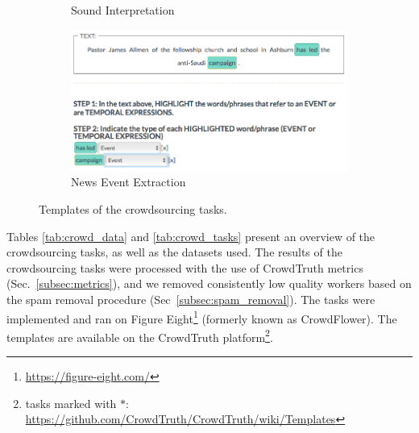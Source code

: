 \begin{figure}[!tb]
\begin{subfigure}{.5\textwidth}
\caption{Sound Interpretation}
\label{fig:screenshot_sounds}
\end{subfigure}%
\begin{subfigure}{.5\textwidth}
\includegraphics[width=\linewidth]{img/news_event_extraction.png}
\caption{News Event Extraction}
\label{fig:screenshot_news}
\end{subfigure}
\caption{Templates of the crowdsourcing tasks.}
\end{figure}


Tables \ref{tab:crowd_data} and \ref{tab:crowd_tasks} present an overview of the crowdsourcing tasks, as well as the datasets used. The results of the crowdsourcing tasks were processed with the use of CrowdTruth metrics (Sec.~\ref{subsec:metrics}), and we removed consistently low quality workers based on the spam removal procedure (Sec~\ref{subsec:spam_removal}). The tasks were implemented and ran on Figure Eight\footnote{\url{https://figure-eight.com/}} (formerly known as CrowdFlower). The templates are available on the CrowdTruth platform\footnote{tasks marked with $*$: \url{https://github.com/CrowdTruth/CrowdTruth/wiki/Templates}}.

\begin{table}[!htp]
	\caption{Crowdsourcing task data.}
    \label{tab:crowd_tasks}
\end{table}


